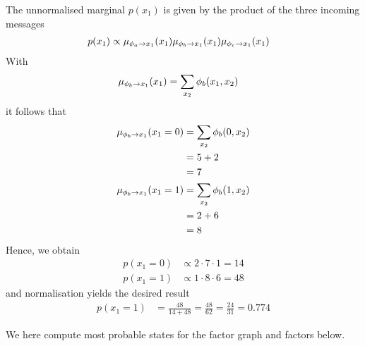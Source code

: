 \begin{exenumerate}
    \begin{solution}
      The unnormalised marginal $p(x_1)$ is given by the product of the three incoming messages
      \begin{align}
        p(x_1) & \propto \fxmess{\phi_a}{x_1}{1}(x_1)\fxmess{\phi_b}{x_1}{1}(x_1) \fxmess{\phi_c}{x_1}{1}(x_1)
      \end{align}
      With
      \begin{align}
        \fxmess{\phi_b}{x_1}{1}(x_1) & = \sum_{x_2} \phi_b(x_1,x_2)
      \end{align}
      it follows that
      \begin{align}
        \fxmess{\phi_b}{x_1}{1}(x_1=0) & = \sum_{x_2} \phi_b(0,x_2)\\
        & = 5+2 \\
        & = 7\\
        \fxmess{\phi_b}{x_1}{1}(x_1=1) & = \sum_{x_2} \phi_b(1,x_2)\\
        & = 2+6\\
        & = 8
      \end{align}
      Hence, we obtain
      \begin{align}
        p(x_1=0) &\propto 2 \cdot 7 \cdot 1 = 14\\
        p(x_1=1) &\propto 1 \cdot 8 \cdot 6 = 48
      \end{align}
      and normalisation yields the desired result
      \begin{align}
        p(x_1=1) & = \frac{48}{14+48} = \frac{48}{62} = \frac{24}{31} = 0.774
      \end{align}
     
    \end{solution}


    
  \end{exenumerate}

  


\label{ex:max-sum-message-passing}
We here compute most probable states for the factor graph and factors below.

  \begin{center}
  \end{center}
 

